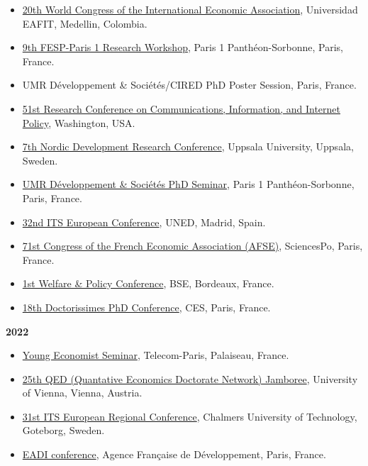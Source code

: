 \documentclass[
]{article}
\begin{document}
\begin{itemize}
\item
  \href{https://ieawc2023.org/}{20th World Congress of the International
  Economic Association}, Universidad EAFIT, Medellin, Colombia.
\item
  \href{https://fesp-eg.org/wp-content/uploads/2023/03/Call_9thFEPS_Paris1.pdf}{9th
  FESP-Paris 1 Research Workshop}, Paris 1 Panthéon-Sorbonne, Paris,
  France.
\item
  UMR Développement \& Sociétés/CIRED PhD Poster Session, Paris, France.
\item
  \href{http://www.tprcweb.com/overview-2023}{51st Research Conference
  on Communications, Information, and Internet Policy}, Washington, USA.
\item
  \href{https://www.nordev2023.se/}{7th Nordic Development Research
  Conference}, Uppsala University, Uppsala, Sweden.
\item
  \href{https://umr-devsoc.pantheonsorbonne.fr/}{UMR Développement \&
  Sociétés PhD Seminar}, Paris 1 Panthéon-Sorbonne, Paris, France.
\item
  \href{https://itseurope.org/2023/}{32nd ITS European Conference},
  UNED, Madrid, Spain.
\item
  \href{https://afse2023.sciencesconf.org/}{71st Congress of the French
  Economic Association (AFSE)}, SciencesPo, Paris, France.
\item
  \href{https://wapsociety.org/event/conference-individual-and-collective-responses-to-a-troubled-world}{1st
  Welfare \& Policy Conference}, BSE, Bordeaux, France.
\item
  \href{https://sites.google.com/site/doctorissimes3/18th-doctorissimes-2023}{18th
  Doctorissimes PhD Conference}, CES, Paris, France.
\end{itemize}

\textbf{2022}

\begin{itemize}
\item
  \href{https://www.digitaleconomics-paris.fr/young-economist-seminar}{Young
  Economist Seminar}, Telecom-Paris, Palaiseau, France.
\item
  \href{https://www.vgse.at/about-vgse/qed-network/}{25th QED
  (Quantative Economics Doctorate Network) Jamboree}, University of
  Vienna, Vienna, Austria.
\item
  \href{https://itseurope.org/2022/}{31st ITS European Regional
  Conference}, Chalmers University of Technology, Goteborg, Sweden.
\item
  \href{https://iedes.pantheonsorbonne.fr/evenements/iedes-eadi-france-journee-detude-internationale}{EADI
  conference}, Agence Française de Développement, Paris, France.
\end{itemize}
\end{document}
